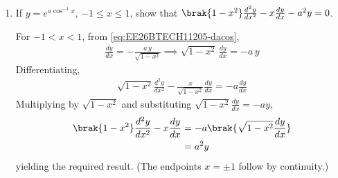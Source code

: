 \begin{enumerate}[label=\thesubsection.\arabic*, ref=\thesubsection.\theenumi, itemsep=3ex]
\medskip
\solution Taking logarithms of the absolute values (valid wherever $x,y,x+y \neq 0$)
\begin{align}
	m\ln\abs{x} + n\ln\abs{y} = \brak{m+n}\ln\abs{x+y}
\end{align}
Differentiating with respect to $x$ using \eqref{eq:EE26BTECH11205-logdiff},
\begin{align}
	\frac{m}{x} + \frac{n}{y}\frac{dy}{dx} = \frac{m+n}{x+y}\brak{1 + \frac{dy}{dx}}
	\\
	\implies \frac{dy}{dx}\brak{\frac{n}{y} - \frac{m+n}{x+y}} = \frac{m+n}{x+y} - \frac{m}{x}
	\\
	\implies \frac{dy}{dx}\cdot\frac{nx-my}{y\brak{x+y}} = \frac{nx-my}{x\brak{x+y}}
	\\
	\implies \brak{nx-my}\brak{x\frac{dy}{dx} - y} = 0
\end{align}
If $nx \neq my$, then $x\frac{dy}{dx} = y$. If $nx = my$ on an interval, then $y = \frac{n}{m}x$ there and $\frac{dy}{dx} = \frac{n}{m} = \frac{y}{x}$. In both cases
\begin{align}
	\frac{dy}{dx} = \frac{y}{x}
\end{align}
Remark. For integers $m,n$, dividing the given relation by $x^{m+n}$ gives $t^n = \brak{1+t}^{m+n}$ with $t = \frac{y}{x}$. This polynomial equation has finitely many roots, so $t$ is constant, $y = tx$ and $\frac{dy}{dx} = t = \frac{y}{x}$. For $m = 2$, $n = 3$, the root $t \approx -2.8906$ is verified by the following code.

\begin{lstlisting}[frame=single, basicstyle=\rmfamily, escapeinside={(*@}{@*)}]
(*@\makebox[\dimexpr\linewidth-2\fboxsep-2\fboxrule\relax][c]{codes/Q15.py}@*)
\end{lstlisting}

\item
If $y = e^{a\cos^{-1}x}$, $-1\le x\le1$, show that $\brak{1-x^2}\frac{d^2y}{dx^2} - x\frac{dy}{dx} - a^2y = 0$.

\medskip
\solution For $-1<x<1$, from \eqref{eq:EE26BTECH11205-dacos},
\begin{align}
	\frac{dy}{dx} = -\frac{a\,y}{\sqrt{1-x^2}} \implies \sqrt{1-x^2}\,\frac{dy}{dx} = -a\,y
\end{align}
Differentiating,
\begin{align}
	\sqrt{1-x^2}\frac{d^2y}{dx^2} - \frac{x}{\sqrt{1-x^2}}\frac{dy}{dx} = -a\frac{dy}{dx}
\end{align}
Multiplying by $\sqrt{1-x^2}$ and substituting $\sqrt{1-x^2}\frac{dy}{dx} = -ay$,
\begin{align}
	\brak{1-x^2}\frac{d^2y}{dx^2} - x\frac{dy}{dx} &= -a\brak{\sqrt{1-x^2}\frac{dy}{dx}} \notag
	\\
	&= a^2y
\end{align}
yielding the required result. (The endpoints $x=\pm1$ follow by continuity.)


\end{enumerate}
